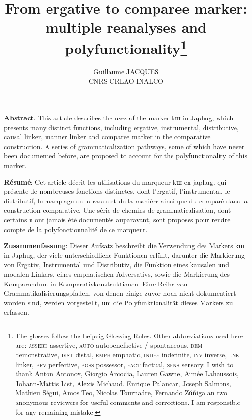\documentclass[oldfontcommands,oneside,a4paper,11pt]{article}
\newcommand{\ipa}[1]{{\phon #1}} %
\begin{document}
 
 
\title{From ergative to comparee marker: multiple reanalyses and polyfunctionality\footnote{The glosses follow the Leipzig Glossing Rules. Other abbreviations used here are:   \textsc{assert} assertive, \textsc{auto} autobenefactive / spontaneous,  \textsc{dem} demonstrative, \textsc{dist} distal, \textsc{emph} emphatic, \textsc{indef} indefinite, \textsc{inv} inverse,  \textsc{lnk} linker, \textsc{pfv} perfective, \textsc{poss} possessor, \textsc{fact} factual,  \textsc{sens} sensory. I wish to thank Anton Antonov, Giorgio Arcodia, Lauren Gawne, Aimée Lahaussois, Johann-Mattis List, Alexis Michaud,  Enrique Palancar, Joseph Salmons, Mathieu Ségui, Amos Teo, Nicolas Tournadre, Fernando Zúñiga an two anonymous reviewers for useful comments and corrections. I am responsible for any remaining mistake. }}
 

\author{Guillaume JACQUES\\CNRS-CRLAO-INALCO}
\maketitle
   \sloppy
\textbf{Abstract}: This article describes the uses of the marker  \ipa{kɯ} in Japhug, which presents many distinct functions, including ergative, instrumental, distributive, causal linker, manner linker and comparee marker in the comparative construction. A series of grammaticalization pathways, some of which have never been documented before, are proposed to account for the polyfunctionality of this marker.

\textbf{Résumé}: Cet article décrit les utilisations du marqueur \ipa{kɯ} en japhug, qui présente de nombreuses fonctions distinctes, dont l'ergatif, l'instrumental, le distributif, le marquage de la cause et de la manière ainsi que du comparé dans la construction comparative. Une série de chemins de grammaticalisation, dont certains n'ont jamais été documentés auparavant, sont proposés pour rendre compte de la polyfonctionnalité de ce marqueur.

\textbf{Zusammenfassung}: Dieser Aufsatz beschreibt die Verwendung des Markers \ipa{kɯ} in Japhug, der viele unterschiedliche Funktionen erfüllt, darunter die Markierung von Ergativ, Instrumental und Distributiv, die Funktion eines kausalen und modalen Linkers, eines emphatischen Adversativs, sowie die Markierung des Komparandum in Komparativkonstruktionen. Eine Reihe von Grammatikalisierungspfaden, von denen einige zuvor noch nicht dokumentiert worden sind, werden vorgestellt, um die Polyfunktionalität
dieses Markers zu erfassen.
\end{document}
